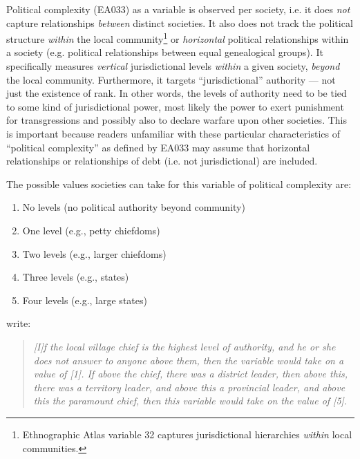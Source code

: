 \documentclass[a4paper,10pt]{article} %
\begin{document}
Political complexity (EA033) as a variable is observed per society, i.e. it does \emph{not} capture relationships \emph{between} distinct societies. It also does not track the political structure \emph{within} the local community\footnote{Ethnographic Atlas variable 32 captures jurisdictional hierarchies \emph{within} local communities.} or \emph{horizontal} political relationships within a society (e.g. political relationships between equal genealogical groups). It specifically measures \emph{vertical} jurisdictional levels \emph{within} a given society, \emph{beyond} the local community. Furthermore, it targets ``jurisdictional'' authority --- not just the existence of rank. In other words, the levels of authority need to be tied to some kind of jurisdictional power, most likely the power to exert punishment for transgressions and possibly also to declare warfare upon other societies. This is important because readers unfamiliar with these particular characteristics of ``political complexity'' as defined by EA033 may assume that horizontal relationships or relationships of debt (i.e. not jurisdictional) are included. 

The possible values societies can take for this variable of political complexity are:

\begin{enumerate}
\item No levels (no political authority beyond community)
\item One level (e.g., petty chiefdoms)
\item Two levels (e.g., larger chiefdoms)
\item Three levels (e.g., states) 
\item Four levels (e.g., large states)
\end{enumerate}

\citet{giuliano2018ancestral} write: 

\begin{quotation}
\noindent\emph{[I]f the local village chief is the highest level of authority, and he or she does not answer to anyone above them, then the variable would take on a value of [1]. If above the chief, there was a district leader, then above this, there was a territory leader, and above this a provincial leader, and above this the paramount chief, then this variable would take on the value of [5].} 
\begin{flushright}
\citet[9]{giuliano2018ancestral}
\end{flushright}
\end{quotation}
\end{document}
